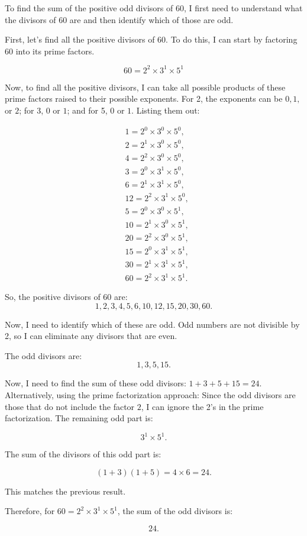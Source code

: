 \begin{figure*}[htbp]
    \centering
\begin{tcolorbox}[title=Long CoT Example, promptstyle]
\lstset{
    basicstyle=\normalfont\sffamily\footnotesize,
    breaklines=true,
    frame=none,
    columns=fullflexible,
}
To find the sum of the positive odd divisors of 60, I first need to understand what the divisors of 60 are and then identify which of those are odd.

First, let's find all the positive divisors of 60. To do this, I can start by factoring 60 into its prime factors.

\[
60 = 2^2 \times 3^1 \times 5^1
\]

Now, to find all the positive divisors, I can take all possible products of these prime factors raised to their possible exponents. For 2, the exponents can be \(0, 1,\) or \(2\); for 3, \(0\) or \(1\); and for 5, \(0\) or \(1\). Listing them out:

\[
\begin{aligned}
&1 = 2^0 \times 3^0 \times 5^0, \\
&2 = 2^1 \times 3^0 \times 5^0, \\
&4 = 2^2 \times 3^0 \times 5^0, \\
&3 = 2^0 \times 3^1 \times 5^0, \\
&6 = 2^1 \times 3^1 \times 5^0, \\
&12 = 2^2 \times 3^1 \times 5^0, \\
&5 = 2^0 \times 3^0 \times 5^1, \\
&10 = 2^1 \times 3^0 \times 5^1, \\
&20 = 2^2 \times 3^0 \times 5^1, \\
&15 = 2^0 \times 3^1 \times 5^1, \\
&30 = 2^1 \times 3^1 \times 5^1, \\
&60 = 2^2 \times 3^1 \times 5^1.
\end{aligned}
\]

So, the positive divisors of 60 are:
\[
1, 2, 3, 4, 5, 6, 10, 12, 15, 20, 30, 60.
\]

Now, I need to identify which of these are odd. Odd numbers are not divisible by 2, so I can eliminate any divisors that are even.

The odd divisors are:
\[
1, 3, 5, 15.
\]

Now, I need to find the sum of these odd divisors:
$1 + 3 + 5 + 15 = 24$.
Alternatively, using the prime factorization approach: Since the odd divisors are those that do not include the factor \(2\), I can ignore the 2's in the prime factorization. The remaining odd part is:

\[
3^1 \times 5^1.
\]

The sum of the divisors of this odd part is:

\[
(1 + 3)(1 + 5) = 4 \times 6 = 24.
\]

This matches the previous result.

Therefore, for \( 60 = 2^2 \times 3^1 \times 5^1 \), the sum of the odd divisors is:

\[
\boxed{24}.
\]
\end{tcolorbox}
\caption{Long CoT Example}
    \label{fig: long cot example}
\end{figure*}
